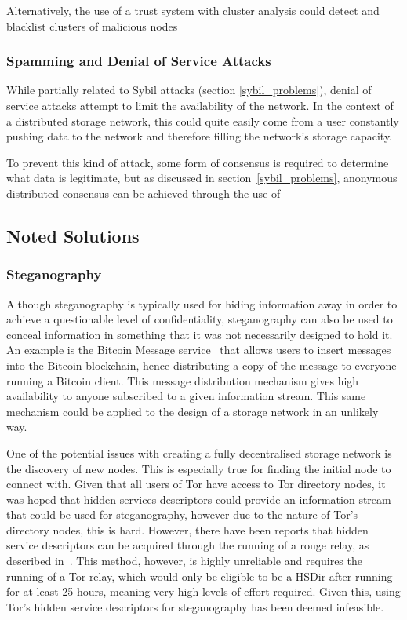 			Alternatively, the use of a trust system with cluster analysis could detect and blacklist clusters of malicious nodes
		\subsubsection*{Spamming and Denial of Service Attacks}
			While partially related to Sybil attacks (section \ref{sybil_problems}), denial of service attacks attempt to limit the availability of the network. In the context of a distributed storage network, this could quite easily come from a user constantly pushing data to the network and therefore filling the network's storage capacity.
			
			To prevent this kind of attack, some form of consensus is required to determine what data is legitimate, but as discussed in section~\ref{sybil_problems}, anonymous distributed consensus can be achieved through the use of 
	\subsection{Noted Solutions}
		\subsubsection*{Steganography}
				Although steganography is typically used for hiding information away in order to achieve a questionable level of confidentiality, steganography can also be used to conceal information in something that it was not necessarily designed to hold it. An example is the Bitcoin Message service~\cite{btcmsg} that allows users to insert messages into the Bitcoin blockchain, hence distributing a copy of the message to everyone running a Bitcoin client. This message distribution mechanism gives high availability to anyone subscribed to a given information stream. This same mechanism could be applied to the design of a storage network in an unlikely way.
				
				One of the potential issues with creating a fully decentralised storage network is the discovery of new nodes. This is especially true for finding the initial node to connect with. Given that all users of Tor have access to Tor directory nodes, it was hoped that hidden services descriptors could provide an information stream that could be used for steganography, however due to the nature of Tor's directory nodes, this is hard. However, there have been reports that hidden service descriptors can be acquired through the running of a rouge relay, as described in~\cite{crawl}. This method, however, is highly unreliable and requires the running of a Tor relay, which would only be eligible to be a HSDir after running for at least 25 hours, meaning very high levels of effort required. Given this, using Tor's hidden service descriptors for steganography has been deemed infeasible.
